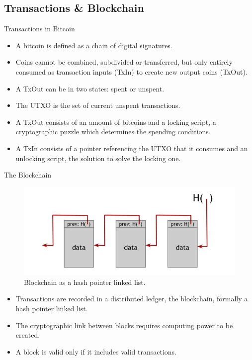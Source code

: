 \documentclass[usenames,dvipsnames]{beamer}
\begin{document}
    \subsection{Transactions \& Blockchain}
    \begin{frame}{Transactions in Bitcoin}
        \begin{itemize}
            \item A \alert{bitcoin} is defined as a chain of digital signatures.
            \item Coins cannot be combined, subdivided or transferred, but only \alert{entirely consumed} as transaction inputs (TxIn) to create new output coins (TxOut).
            \item A TxOut can be in two states: \alert{spent} or \alert{unspent}.
            \item The \alert{UTXO} is the set of current unspent transactions.
            \item A \alert{TxOut} consists of an amount of bitcoins and a \alert{locking script}, a cryptographic puzzle which determines the spending conditions.
            \item A \alert{TxIn} consists of a pointer referencing the UTXO that it consumes and an \alert{unlocking script}, the solution to solve the locking one.
        \end{itemize}
    \end{frame}
    
    \begin{frame}{The Blockchain}
        \begin{figure}
        \centering
        \includegraphics[width=0.7\linewidth]{Images/blockchain.png}
        \caption{Blockchain as a hash pointer linked list.}
        \end{figure}
        \begin{itemize}
            \item Transactions are recorded in a \alert{distributed ledger}, the \alert{blockchain}, formally a hash pointer linked list.
            \item The \alert{cryptographic link} between blocks requires computing power to be created.
            \item A block is \alert{valid} only if it includes \alert{valid transactions}.
        \end{itemize} 
    \end{frame}
    
\end{document}

